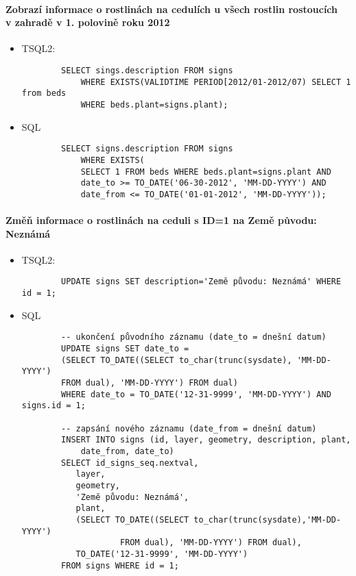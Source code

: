 \documentclass[12pt,a4paper]{article}
\begin{document}
\paragraph*{Zobrazí informace o rostlinách na cedulích u všech rostlin rostoucích \\ v zahradě v 1. polovině roku 2012}
\begin{itemize}

	\item
	TSQL2:
		\begin{verbatim}
		SELECT sings.description FROM signs 
			WHERE EXISTS(VALIDTIME PERIOD[2012/01-2012/07) SELECT 1 from beds 
			WHERE beds.plant=signs.plant);
		\end{verbatim}
	\item
	SQL
		\begin{verbatim}
		SELECT signs.description FROM signs
			WHERE EXISTS(
    		SELECT 1 FROM beds WHERE beds.plant=signs.plant AND
    		date_to >= TO_DATE('06-30-2012', 'MM-DD-YYYY') AND
    		date_from <= TO_DATE('01-01-2012', 'MM-DD-YYYY'));
		\end{verbatim}

\end{itemize}

\paragraph*{Změň informace o rostlinách na ceduli s ID=1 na Země původu: Neznámá}
\begin{itemize}

	\item
	TSQL2:
		\begin{verbatim}
		UPDATE signs SET description='Země původu: Neznámá' WHERE id = 1;
		\end{verbatim}
	\item
	SQL
		\begin{verbatim}
		-- ukončení původního záznamu (date_to = dnešní datum)
		UPDATE signs SET date_to = 
		(SELECT TO_DATE((SELECT to_char(trunc(sysdate), 'MM-DD-YYYY') 
		FROM dual), 'MM-DD-YYYY') FROM dual)
		WHERE date_to = TO_DATE('12-31-9999', 'MM-DD-YYYY') AND signs.id = 1;
		
		-- zapsání nového záznamu (date_from = dnešní datum)		
		INSERT INTO signs (id, layer, geometry, description, plant, 
			date_from, date_to)
    	SELECT id_signs_seq.nextval,
           layer,
           geometry,
           'Země původu: Neznámá',
           plant,
           (SELECT TO_DATE((SELECT to_char(trunc(sysdate),'MM-DD-YYYY') 
           			FROM dual), 'MM-DD-YYYY') FROM dual),
           TO_DATE('12-31-9999', 'MM-DD-YYYY')
    	FROM signs WHERE id = 1;
		\end{verbatim}

\end{itemize}
\end{document}
